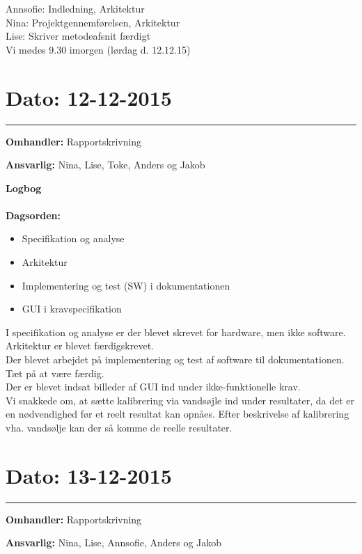 Annsofie: Indledning, Arkitektur\\
Nina: Projektgennemførelsen, Arkitektur\\
Lise: Skriver metodeafsnit færdigt\\
Vi mødes 9.30 imorgen (lørdag d. 12.12.15)\\


	
	
\section{Dato: 12-12-2015 }
\hrule

\textbf{Omhandler:} Rapportskrivning

\textbf{Ansvarlig:} Nina, Lise, Toke, Anders og Jakob

\textbf{Logbog}
\\
\\
\textbf{Dagsorden:}
\begin{itemize}
	\item Specifikation og analyse
	\item Arkitektur
	\item Implementering og test (SW) i dokumentationen
	\item GUI i kravspecifikation
\end{itemize}

I specifikation og analyse er der blevet skrevet for hardware, men ikke software.\\
Arkitektur er blevet færdigskrevet. \\
Der blevet arbejdet på implementering og test af software til dokumentationen. Tæt på at være færdig.\\
Der er blevet indsat billeder af GUI ind under ikke-funktionelle krav.\\
Vi snakkede om, at sætte kalibrering via vandsøjle ind under resultater, da det er en nødvendighed før et reelt resultat kan opnåes. Efter beskrivelse af kalibrering vha. vandsølje kan der så komme de reelle resultater.

	
	
	
\section{Dato: 13-12-2015 }
\hrule

\textbf{Omhandler:} Rapportskrivning

\textbf{Ansvarlig:} Nina, Lise, Annsofie, Anders og Jakob

